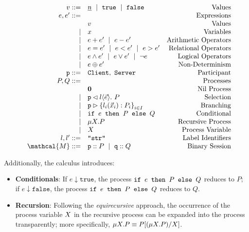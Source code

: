 \begin{figure}[!hb]
\doublespacing
\[
\begin{array}{rlr}
v ::= & \underline{n}~\mid~\texttt{true}~\mid~\texttt{false} 
	& \text{Values} \\
e, e' ::= & & \text{Expressions} \\
	& v & \text{Values} \\
\mid	 & x & \text{Variables} \\
\mid & e + e'~\mid~e - e' & \text{Arithmetic Operators} \\
\mid & e = e'~\mid~e < e' ~\mid~e > e' & \text{Relational Operators} \\
\mid & e \wedge e'~\mid~e \vee e' ~\mid~\neg e & \text{Logical Operators} \\
\mid & e \oplus e' & \text{Non-Determinism} \\

\mrole{p} ::= & \mrole{Client},~\mrole{Server} & \text{Participant} \\

P,Q ::= & & \text{Processes} \\
     & \mathbf{0} & \text{Nil Process} \\
\mid & \sel{p}{l}{\vec e}.~P & \text{Selection} \\
\mid & \bra{p}{l_i(\vec x_i): P_i}{i\in I} & \text{Branching} \\
\mid & \pcond{e}{P}{Q} & \text{Conditional} \\
\mid & \precursion{P} & \text{Recursive Process} \\
\mid & \precvar & \text{Process Variable} \\

l, l' ::= & \texttt{``str''} & \text{Label Identifiers} \\

\mathcal{M} ::= & \ptprocess{p}{P} ~\mid~ \ptprocess{q}{Q} 
	& \text{Binary Session} \\
\end{array}
\]
\singlespacing
{}
\label{fig:sync}
\end{figure}

Additionally, the calculus introduces:

\begin{itemize}
\item \textbf{Conditionals}: 
If $e \downarrow \texttt{true}$, 
the process $\texttt{if }{e}\texttt{ then }{P}\texttt{ else }{Q}$ reduces to $P$; 
if $e \downarrow \texttt{false}$, 
the process $\texttt{if }{e}\texttt{ then }{P}\texttt{ else }{Q}$ reduces to $Q$.

\item \textbf{Recursion}: 
Following the \textit{equirecursive} approach, 
the occurrence of the process variable $X$ 
in the recursive process can be 
expanded into the process transparently;
more specifically, $\mu X . {P} \equiv P[(\mu X . {P})/X]$.
\end{itemize}

